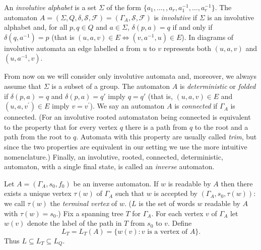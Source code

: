 \documentclass[a4paper,12pt]{article}
\renewcommand{\a}{\alpha }
\renewcommand{\b}{\beta }
\newcommand{\G}{\Gamma }
\renewcommand{\d}{\delta }
\renewcommand{\S}{\Sigma }
\renewcommand{\t}{\tau }
\numberwithin{equation}{section}
\numberwithin{figure}{section}
\begin{document}


An {\em involutive alphabet} is a set $\S$ of the form $\{a_1, \ldots, ,
a_r, a_1^{-1}, \ldots, a_r^{-1}\}$.
The automaton $A =(\S, Q, \d,\mathcal{S},\mathcal{F})
= (\G_A, \mathcal{S}, \mathcal{F})$ is {\em
involutive} if $\S$ is an
involutive alphabet and, for all $p, q \in Q$ and $a \in \S$,
$\d(p,a)=q$ if and only if $\d(q, a^{-1})=p$ (that is $(u, a, v) \in E
\Leftrightarrow (v, a^{-1}, u) \in E$).
In diagrams of involutive automata an edge labelled $a$  from
$u$ to $v$  represents
both $(u,a,v)$ and $(u,a^{-1},v)$.

From now on we will
consider only involutive automata and, moreover, we always assume that $\S$ is a subset of a group.
The automaton $A$
is {\em deterministic}  or {\em folded} if $\d(p,a)=q$ and
$\d(p,a)=q'$ imply $q=q'$ (that is, $(u, a, v)
\in E$ and $(u, a, v^\prime) \in E$ imply $v=v^\prime$).
We say an automaton $A$ is \emph{connected} if $\G_A$ is connected.
(For an involutive rooted automataton being connected is equivalent to the property that
for every vertex $q$ there is a path from $q$ to the root and a path from the root to $q$.
Automata with this property are usually called \emph{trim}, but since the two properties are
equivalent in our setting we use the more intuitive nomenclature.)
Finally, an involutive, rooted, connected, deterministic,
automaton, with a single final state, is called an {\em inverse}
automaton.

Let $A=(\G_A,s_0,f_0)$ be an inverse automaton.
If $w$ is readable by $A$ then there exists a
unique vertex  $\t(w)$ of $\G_A$ such that $w$ is accepted by
$(\G_A,s_0,\t(w))$: we call $\t(w)$ the {\em terminal vertex} of $w$. ($L$ is the set of words $w$ readable by $A$ with
$\t(w)=s_0$.)
Fix a spanning tree $T$ for $\G_A$. For each vertex $v$ of $\G_A$
let $w(v)$ denote the label of the path in
$T$ from $s_0$ to $v$.  Define
\[L_T=L_T(A)=\{w(v): v \textrm{ is a vertex of } A\}.\]
Thus $L\subseteq L_T\subseteq L_Q$.
\end{document}
